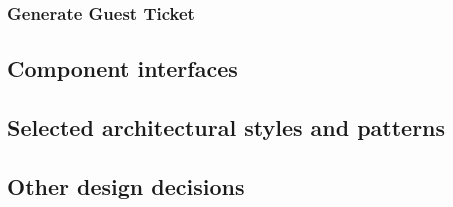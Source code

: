 \subsubsection{Generate Guest Ticket} %



\subsection{Component interfaces}
\subsection{Selected architectural styles and patterns} %
\subsection{Other design decisions} %

